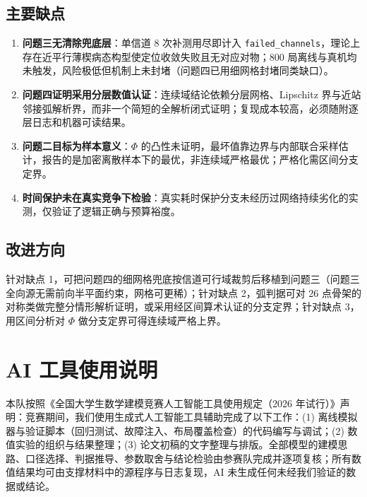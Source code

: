 \documentclass[12pt,a4paper]{ctexart}
\begin{document}
\subsection{主要缺点}

\begin{enumerate}[leftmargin=2em,itemsep=3pt]
  \item \textbf{问题三无清除兜底层}：单信道 8 次补测用尽即计入 \verb|failed_channels|，理论上存在近平行薄楔病态构型使定位收敛失败且无对应对物；800 局离线与真机均未触发，风险极低但机制上未封堵（问题四已用细网格封堵同类缺口）。
  \item \textbf{问题四证明采用分层数值认证}：连续域结论依赖分层网格、Lipschitz 界与近站邻接弧解析界，而非一个简短的全解析闭式证明；复现成本较高，必须随附逐层日志和机器可读结果。
  \item \textbf{问题二目标为样本意义}：$\Phi$ 的凸性未证明，最坏值靠边界与内部联合采样估计，报告的是加密离散样本下的最优，非连续域严格最优；严格化需区间分支定界。
  \item \textbf{时间保护未在真实竞争下检验}：真实耗时保护分支未经历过网络持续劣化的实测，仅验证了逻辑正确与预算裕度。
\end{enumerate}

\subsection{改进方向}

针对缺点 1，可把问题四的细网格兜底按信道可行域裁剪后移植到问题三（问题三全向源无需前向半平面约束，网格可更稀）；针对缺点 2，弧判据可对 26 点骨架的对称类做完整分情形解析证明，或采用经区间算术认证的分支定界；针对缺点 3，用区间分析对 $\Phi$ 做分支定界可得连续域严格上界。

\section*{AI 工具使用说明}

本队按照《全国大学生数学建模竞赛人工智能工具使用规定（2026 年试行）》声明：竞赛期间，我们使用生成式人工智能工具辅助完成了以下工作：(1) 离线模拟器与验证脚本（回归测试、故障注入、布局覆盖检查）的代码编写与调试；(2) 数值实验的组织与结果整理；(3) 论文初稿的文字整理与排版。全部模型的建模思路、口径选择、判据推导、参数取舍与结论检验由参赛队完成并逐项复核；所有数值结果均可由支撑材料中的源程序与日志复现，AI 未生成任何未经我们验证的数据或结论。
\end{document}

